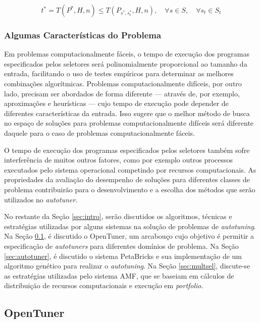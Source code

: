 \documentclass[a4paper, 11pt]{article}
\begin{document}
\begin{equation*}
    t^* = T(P^*,H,n) \leq T(P_{s^*,s_{t}^{*}},H,n), \quad \forall s \in S, \quad \forall s_t \in S_t
\end{equation*}

\subsubsection{Algumas Características do Problema}

Em problemas computacionalmente fáceis, o tempo de execução dos programas
especificados pelos seletores será polinomialmente proporcional ao tamanho da 
entrada, facilitando o uso de testes empíricos para determinar as melhores
combinações algorítmicas. Problemas computacionalmente difíceis, por outro 
lado, precisam ser abordados de forma diferente --- através de, por exemplo,
aproximações e heurísticas --- cujo tempo de execução pode depender de 
diferentes características da entrada. Isso sugere que o melhor método de busca
no espaço de soluções para problemas computacionalmente difíceis será diferente
daquele para o caso de problemas computacionalmente fáceis.

O tempo de execução dos programas especificados pelos seletores também sofre
interferência de muitos outros fatores, como por exemplo outros processos 
executados pelo sistema operacional competindo por recursos computacionais.
As propriedades da avaliação do desempenho de soluções para diferentes classes 
de problema contribuirão para o desenvolvimento e a escolha dos métodos
que serão utilizados no \emph{autotuner}.

No restante da Seção \ref{sec:intro}, serão discutidos os algoritmos, técnicas 
e estratégias utilizadas por alguns sistemas na solução de problemas de 
\emph{autotuning}. Na Seção \ref{sec:opent}, é discutido o OpenTuner,
um arcabouço cujo objetivo é permitir a especificação de \emph{autotuners} 
para diferentes domínios de problema. Na Seção \ref{sec:autotuner}, é discutido
o sistema PetaBricks e sua implementação de um algoritmo genético para realizar
o \emph{autotuning}. Na Seção \ref{sec:multsel}, discute-se as estratégias 
utilizadas pelo sistema AMF, que se baseiam em cálculos de distribuição de 
recursos computacionais e execução em \emph{portfolio}.

\subsection{OpenTuner} \label{sec:opent}
\end{document}
